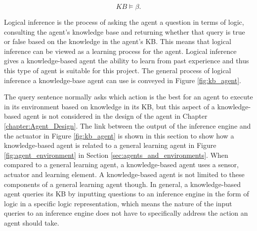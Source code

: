 \begin{equation}
	KB \models \beta.
	\label{eq:entailment_KB_query}
\end{equation}

Logical inference is the process of asking the agent a question in terms of logic, consulting the agent's knowledge base and returning whether that query is true or false based on the knowledge in the agent's KB. This means that logical inference can be viewed as a learning process for the agent. Logical inference gives a knowledge-based agent the ability to learn from past experience and thus this type of agent is suitable for this project.  The general process of logical inference a knowledge-base agent can use is conveyed in Figure \ref{fig:kb_agent}.

The query sentence normally asks which action is the best for an agent to execute in its environment based on knowledge in its KB, but this aspect of a knowledge-based agent is not considered in the design of the agent in Chapter \ref{chapter:Agent_Design}. The link between the output of the inference engine and the actuator in Figure \ref{fig:kb_agent} is shown in this section to show how a knowledge-based agent is related to a general learning agent in Figure  \ref{fig:agent_environment} in Section \ref{sec:agents_and_environments}. When compared to a general learning agent, a knowledge-based agent uses a sensor, actuator and learning element. A knowledge-based agent is not limited to these components of a general learning agent though. In general, a knowledge-based agent queries its KB by inputting questions to an inference engine in the form of logic in a specific logic representation, which means the nature of the input queries to an inference engine does not have to specifically address the action an agent should take. 

